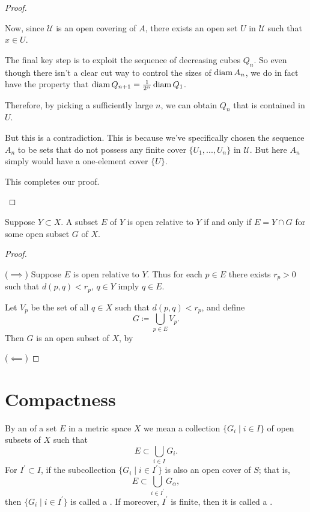 \begin{proof}
\begin{enumerate}[label=(\alph*)]
Now, since $\mathscr{U}$ is an open covering of $A$, there exists an open set $U$ in $\mathscr{U}$ such that $x\in U$.

The final key step is to exploit the sequence of decreasing cubes $Q_n$. So even though there isn't a clear cut way to control the sizes of $\operatorname{diam} A_n$, we do in fact have the property that $\operatorname{diam} Q_{n+1} = \frac{1}{2^n} \operatorname{diam} Q_1$.

Therefore, by picking a sufficiently large $n$, we can obtain $Q_n$ that is contained in $U$.

But this is a contradiction. 
This is because we've specifically chosen the sequence $A_n$ to be sets that do not possess any finite cover $\{U_1,...,U_n\}$ in $\mathscr{U}$. But here $A_n$ simply would have a one-element cover $\{U\}$.

This completes our proof.
\end{enumerate}
\end{proof}

\begin{proposition}
Suppose $Y\subset X$. A subset $E$ of $Y$ is open relative to $Y$ if and only if $E=Y\cap G$ for some open subset $G$ of $X$.
\end{proposition}

\begin{proof} \

($\implies$) Suppose $E$ is open relative to $Y$. Thus for each $p\in E$ there exists $r_p>0$ such that $d(p,q)<r_p$, $q\in Y$ imply $q\in E$.

Let $V_p$ be the set of all $q\in X$ such that $d(p,q)<r_p$, and define
\[G\coloneqq\bigcup_{p\in E}V_p.\]
Then $G$ is an open subset of $X$, by 

($\impliedby$)
\end{proof}
\pagebreak

\section{Compactness}
\begin{definition}
By an  of a set $E$ in a metric space $X$ we mean a collection $\{G_i\mid i\in I\}$ of open subsets of $X$ such that
\[ E\subset\bigcup_{i\in I}G_i. \]
For $I^\prime\subset I$, if the subcollection $\{G_i\mid i\in I^\prime\}$ is also an open cover of $S$; that is,
\[ E\subset\bigcup_{i\in I^\prime}G_\alpha, \]
then $\{G_i\mid i\in I^\prime\}$ is called a . If moreover, $I^\prime$ is finite, then it is called a .
\end{definition}

